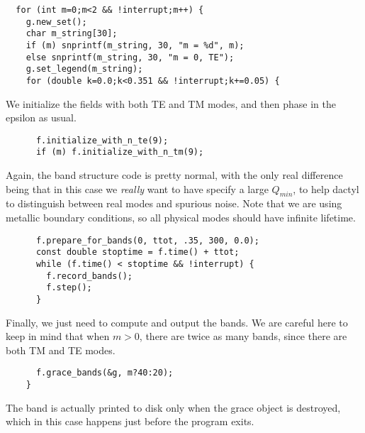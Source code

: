 \begin{verbatim}
  for (int m=0;m<2 && !interrupt;m++) {
    g.new_set();
    char m_string[30];
    if (m) snprintf(m_string, 30, "m = %d", m);
    else snprintf(m_string, 30, "m = 0, TE");
    g.set_legend(m_string);
    for (double k=0.0;k<0.351 && !interrupt;k+=0.05) {
\end{verbatim}
\begin{comment}
      printf("Working on k of %
      fields f(&vac, m);
      f.use_bloch(k);
      f.verbose(1);
      f.phase_in_material(&ma, 1000);
\end{comment}
We initialize the fields with both TE and TM modes, and then phase in the
epsilon as usual.
\begin{verbatim}
      f.initialize_with_n_te(9);
      if (m) f.initialize_with_n_tm(9);
\end{verbatim}
\begin{comment}
      while (f.is_phasing() && !interrupt) f.step();
\end{comment}
Again, the band structure code is pretty normal, with the only real
difference being that in this case we \emph{really} want to have specify a
large $Q_{min}$, to help dactyl to distinguish between real modes and
spurious noise.  Note that we are using metallic boundary conditions, so
all physical modes should have infinite lifetime.
\begin{verbatim}
      f.prepare_for_bands(0, ttot, .35, 300, 0.0);
      const double stoptime = f.time() + ttot;
      while (f.time() < stoptime && !interrupt) {
        f.record_bands();
        f.step();
      }
\end{verbatim}
Finally, we just need to compute and output the bands.  We are careful here
to keep in mind that when $m > 0$, there are twice as many bands, since
there are both TM and TE modes.
\begin{verbatim}
      f.grace_bands(&g, m?40:20);
    }
\end{verbatim}
The band is actually printed to disk only when the grace object is
destroyed, which in this case happens just before the program exits.
\begin{comment}
  }
}
\end{comment}
